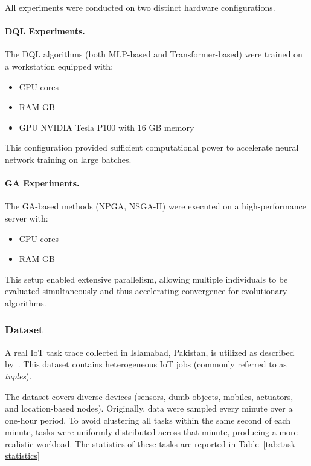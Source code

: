 \documentclass[preprint,3p,authoryear]{elsarticle}
\begin{document}
All experiments were conducted on two distinct hardware configurations.  

\paragraph{DQL Experiments.}  
The DQL algorithms (both MLP-based and Transformer-based) were trained on a workstation equipped with:
\begin{itemize}
    \item CPU cores
    \item RAM GB
    \item GPU\: NVIDIA Tesla P100 with 16 GB memory
\end{itemize}
This configuration provided sufficient computational power to accelerate neural network training on large batches.  

\paragraph{GA Experiments.}  
The GA-based methods (NPGA, NSGA-II) were executed on a high-performance server with:
\begin{itemize}
    \item CPU cores
    \item RAM GB
\end{itemize}
This setup enabled extensive parallelism, allowing multiple individuals to be evaluated simultaneously and thus accelerating convergence for evolutionary algorithms.


\subsubsection{Dataset}\label{subsec:dataset}



A real IoT task trace collected in Islamabad, Pakistan, is utilized as described by~\cite{aazam_cloud_2022}. This dataset contains heterogeneous IoT jobs (commonly referred to as \emph{tuples}).

The dataset covers diverse devices (sensors, dumb objects, mobiles, actuators, and location-based nodes). Originally, data were sampled every minute over a one-hour period. To avoid clustering all tasks within the same second of each minute, tasks were uniformly distributed across that minute, producing a more realistic workload. The statistics of these tasks are reported in Table~\ref{tab:task-statistics}
\end{document}

